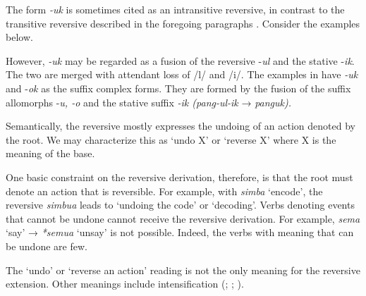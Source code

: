 \documentclass[output=paper]{langsci/langscibook}
\begin{document}
The form \textit{-uk} is sometimes cited as an intransitive reversive, in contrast to the transitive reversive described in the foregoing paragraphs \citep[239]{Ashton1947}. Consider the examples below.

\ea\label{ex:ngonyaningowa:6}
\ea\label{ex:ngonyaningowa:6a}
\ex\label{ex:ngonyaningowa:6b}
\ex\label{ex:ngonyaningowa:6c}
\ex\label{ex:ngonyaningowa:6d}
\ex\label{ex:ngonyaningowa:6e}
\z
\z

However, \textit{-uk} may be regarded as a fusion of the reversive -\textit{ul} and the stative -\textit{ik}. The two are merged with attendant loss of /l/ and /i/. The examples in  have \textit{-uk} and -\textit{ok} as the suffix complex forms. They are formed by the fusion of the suffix allomorphs -\textit{u, -o} and the stative suffix \textit{-ik (pang-ul-ik }→ \textit{panguk).} 

  Semantically, the reversive mostly expresses the undoing of an action denoted by the root. We may characterize this as ‘undo X’ or ‘reverse X’ where X is the meaning of the base.

\ea\label{ex:ngonyaningowa:7}
\ea\label{ex:ngonyaningowa:7a}
\ex\label{ex:ngonyaningowa:7b}
\ex\label{ex:ngonyaningowa:7c}
\ex\label{ex:ngonyaningowa:7d}
\ex\label{ex:ngonyaningowa:7e}
\z
\z

One basic constraint on the reversive derivation, therefore, is that the root must denote an action that is reversible. For example, with \textit{simba} ‘encode’, the reversive \textit{simbua} leads to ‘undoing the code’ or ‘decoding’. Verbs denoting events that cannot be undone cannot receive the reversive derivation. For example, \textit{sema} ‘say’ → \textit{*semua} ‘unsay’ is not possible. Indeed, the verbs with meaning that can be undone are few. 

The ‘undo’ or ‘reverse an action’ reading is not the only meaning for the reversive extension. Other meanings include intensification (\citealt[239]{Ashton1947}; \citealt[90]{Polome1967}; \citealt[78]{Schadeberg2003}).   
\end{document}
